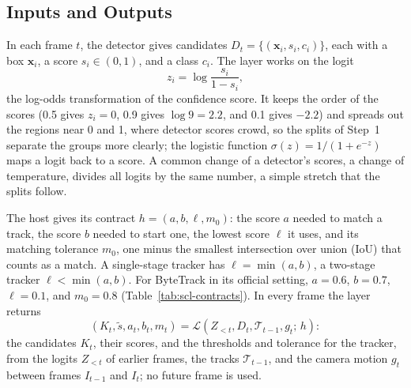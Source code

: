 \subsection{Inputs and Outputs}\label{sec:scl-problem}
In each frame $t$, the detector gives candidates $D_t=\{(\mathbf{x}_i,s_i,c_i)\}$, each with a box $\mathbf{x}_i$, a score $s_i\in(0,1)$, and a class $c_i$. The layer works on the logit
\begin{equation}
z_i=\log\frac{s_i}{1-s_i},
\label{eq:scl-logit}
\end{equation}
the log-odds transformation of the confidence score. It keeps the order of the scores (0.5 gives $z_i=0$, 0.9 gives $\log 9=2.2$, and 0.1 gives $-2.2$) and spreads out the regions near 0 and 1, where detector scores crowd, so the splits of Step~1 separate the groups more clearly; the logistic function $\sigma(z)=1/(1+e^{-z})$ maps a logit back to a score. A common change of a detector's scores, a change of temperature, divides all logits by the same number, a simple stretch that the splits follow.

The host gives its contract $h=(a,b,\ell,m_0)$: the score $a$ needed to match a track, the score $b$ needed to start one, the lowest score $\ell$ it uses, and its matching tolerance $m_0$, one minus the smallest intersection over union (IoU) that counts as a match. A single-stage tracker has $\ell=\min(a,b)$, a two-stage tracker $\ell<\min(a,b)$. For ByteTrack in its official setting, $a=0.6$, $b=0.7$, $\ell=0.1$, and $m_0=0.8$ (Table~\ref{tab:scl-contracts}). In every frame the layer returns
\begin{equation}
\left(K_t,\tilde{s},a_t,b_t,m_t\right)=
\mathcal{L}\left(Z_{<t},D_t,\mathcal{T}_{t-1},g_t;\,h\right):
\label{eq:scl-layer}
\end{equation}
the candidates $K_t$, their scores, and the thresholds and tolerance for the tracker, from the logits $Z_{<t}$ of earlier frames, the tracks $\mathcal{T}_{t-1}$, and the camera motion $g_t$ between frames $I_{t-1}$ and $I_t$; no future frame is used.

